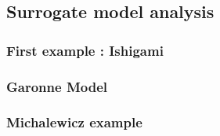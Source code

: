 \documentclass[hidelinks,12pt]{article}
\begin{document}
\subsection{Surrogate model analysis}
\subsubsection{First example : Ishigami}
\subsubsection{Garonne Model }



\subsubsection{Michalewicz example}






\end{document}
